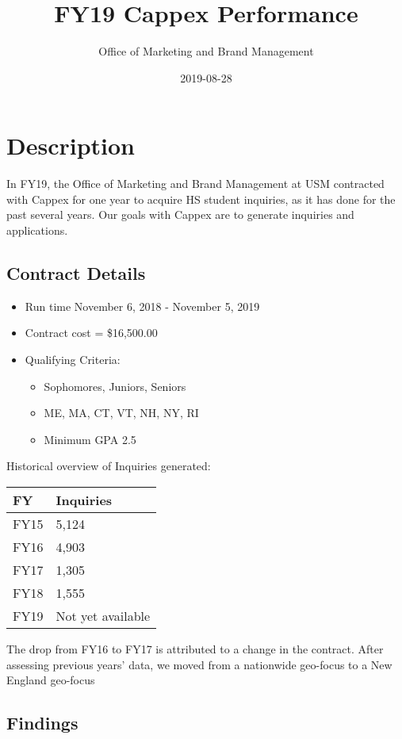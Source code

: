 \documentclass[]{article}
\title{FY19 Cappex Performance}
\author{Office of Marketing and Brand Management}
\date{2019-08-28}
\begin{document}
\maketitle

\hypertarget{description}{%
\section{Description}\label{description}}

In FY19, the Office of Marketing and Brand Management at USM contracted
with Cappex for one year to acquire HS student inquiries, as it has done
for the past several years. Our goals with Cappex are to generate
inquiries and applications.

\hypertarget{contract-details}{%
\subsection{Contract Details}\label{contract-details}}

\begin{itemize}
\item
  Run time November 6, 2018 - November 5, 2019
\item
  Contract cost = \$16,500.00
\item
  Qualifying Criteria:

  \begin{itemize}
  \item
    Sophomores, Juniors, Seniors
  \item
    ME, MA, CT, VT, NH, NY, RI
  \item
    Minimum GPA 2.5
  \end{itemize}
\end{itemize}

Historical overview of Inquiries generated:

\begin{longtable}[]{@{}ll@{}}
\toprule
FY & Inquiries\tabularnewline
\midrule
\endhead
FY15 & 5,124\tabularnewline
FY16 & 4,903\tabularnewline
FY17 & 1,305\tabularnewline
FY18 & 1,555\tabularnewline
FY19 & Not yet available\tabularnewline
\bottomrule
\end{longtable}

The drop from FY16 to FY17 is attributed to a change in the contract.
After assessing previous years' data, we moved from a nationwide
geo-focus to a New England geo-focus

\hypertarget{findings}{%
\subsection{Findings}\label{findings}}
\end{document}
